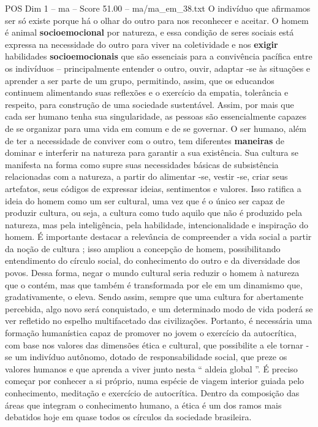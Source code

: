 \begin{textsample}{POS Dim 1 – ma – Score 51.00 – ma/ma\_em\_38.txt}
O indivíduo que afirmamos ser só existe porque há o olhar do outro para nos reconhecer e aceitar.
O homem é animal \textbf{socioemocional} por natureza, e essa condição de seres sociais está expressa na necessidade do outro para viver na coletividade e nos \textbf{exigir} habilidades \textbf{socioemocionais} que são essenciais para a convivência pacífica entre os indivíduos – principalmente entender o outro, ouvir, adaptar -se às situações e aprender a ser parte de um grupo, permitindo, assim, que os educandos continuem alimentando suas reflexões e o exercício da empatia, tolerância e respeito, para construção de uma sociedade sustentável.
Assim, por mais que cada ser humano tenha sua singularidade, as pessoas são essencialmente capazes de se organizar para uma vida em comum e de se governar.
O ser humano, além de ter a necessidade de conviver com o outro, tem diferentes \textbf{maneiras} de dominar e interferir na natureza para garantir a sua existência.
Sua cultura se manifesta na forma como supre suas necessidades básicas de subsistência relacionadas com a natureza, a partir do alimentar -se, vestir -se, criar seus artefatos, seus códigos de expressar ideias, sentimentos e valores.
Isso ratifica a ideia do homem como um ser cultural, uma vez que é o único ser capaz de produzir cultura, ou seja, a cultura como tudo aquilo que não é produzido pela natureza, mas pela inteligência, pela habilidade, intencionalidade e inspiração do homem.
É importante destacar a relevância de compreender a vida social a partir da noção de cultura ; isso ampliou a concepção de homem, possibilitando entendimento do círculo social, do conhecimento do outro e da diversidade dos povos.
Dessa forma, negar o mundo cultural seria reduzir o homem à natureza que o contém, mas que também é transformada por ele em um dinamismo que, gradativamente, o eleva.
Sendo assim, sempre que uma cultura for abertamente percebida, algo novo será conquistado, e um determinado modo de vida poderá se ver refletido no espelho multifacetado das civilizações.
Portanto, é necessária uma formação humanística capaz de promover no jovem o exercício da autocrítica, com base nos valores das dimensões ética e cultural, que possibilite a ele tornar -se um indivíduo autônomo, dotado de responsabilidade social, que preze os valores humanos e que aprenda a viver junto nesta “ aldeia global ”.
É preciso começar por conhecer a si próprio, numa espécie de viagem interior guiada pelo conhecimento, meditação e exercício de autocrítica.
Dentro da composição das áreas que integram o conhecimento humano, a ética é um dos ramos mais debatidos hoje em quase todos os círculos da sociedade brasileira.

\end{textsample}
